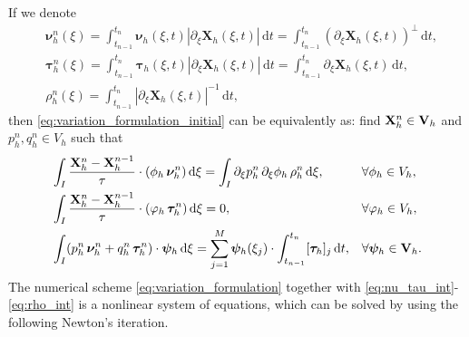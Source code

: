 \documentclass[review]{elsarticle}
\begin{document}
If we denote
\begin{align}
    & \boldsymbol\nu_h^n(\xi) = \int_{t_{n-1}}^{t_{n}} \boldsymbol\nu_h(\xi, t) |\partial_{\xi} \mathbf{X}_h(\xi, t) | \, \mathrm{d}t = \int_{t_{n-1}}^{t_{n}} (\partial_{\xi}\mathbf{X}_h(\xi, t) )^{\perp}\, \mathrm{d}t, \label{eq:nu_tau_int} \\
    & \boldsymbol\tau_h^n(\xi)  = \int_{t_{ n -1}}^{t_{n}}\boldsymbol\tau_h(\xi, t) |\partial_{\xi}\mathbf{X}_h(\xi, t) |\, \mathrm{d}t = \int_{t_{ n - 1}}^{t_{n}}\partial_{\xi} \mathbf{X}_h(\xi, t) \, \mathrm{d}t, \label{eq:tau_int}\\
    & \rho_h^n(\xi) = \int_{t_{n-1}}^{t_{n}} |\partial_{\xi}\mathbf{X}_h(\xi, t) |^{-1}\, \mathrm{d}t, \label{eq:rho_int}
\end{align}
then \eqref{eq:variation_formulation_initial} can be equivalently as:
find $\mathbf{X}_h^n\in {\bf V}_h$ and $p_h^n, q_h^n \in V_h$ such that
\begin{subequations}\label{eq:variation_formulation}
\begin{align}
& \int_I \dfrac{\mathbf{X}_h^n - \mathbf{X}_h^{n-1}}{\tau}\cdot (\phi_h\,\boldsymbol\nu_h^n)\, \mathrm{d}\xi = \int_I \partial_{\xi} p_h^n \, \partial_\xi \phi_h \, \rho_h^n \,\mathrm{d}\xi,  && \forall \phi_h\in V_h,  \label{eq:variation_formulation_a}\\
& \int_I \dfrac{\mathbf{X}_h^n - \mathbf{X}_h^{n-1}}{\tau}\cdot (\varphi_h\,\boldsymbol\tau_h^n)\, \mathrm{d}\xi = 0, &&\forall \varphi_h\in V_h,  \label{eq:variation_formulation_b}\\
&  \int_I (p_h^n\,\boldsymbol\nu_h^n + q_h^n\,\boldsymbol\tau_h^n)\cdot \boldsymbol\psi_h\, \mathrm{d}\xi  = \sum_{j = 1}^M\boldsymbol\psi_h(\xi_j)\cdot \int_{t_{n-1}}^{t_{n}}[\boldsymbol\tau_h]_j\, \mathrm{d}t, && \forall \boldsymbol\psi_h\in {\bf V}_h.  \label{eq:variation_formulation_c}
\end{align}
\end{subequations}
The numerical scheme \eqref{eq:variation_formulation} together with \eqref{eq:nu_tau_int}-\eqref{eq:rho_int} is a nonlinear system of equations, which can be solved by using the following Newton's iteration.
\end{document}
